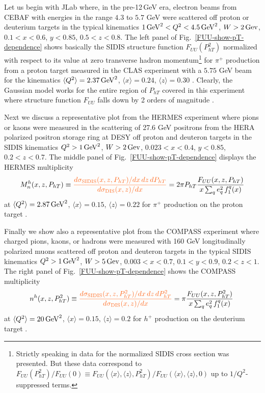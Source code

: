 \documentclass[a4paper,11pt]{article}
\newcommand{\blue}[1]{{\color{blue} #1}}
\newcommand{\be}{\begin{equation}}
\newcommand{\ee}{\end{equation}}
\newcommand{\la}{\langle}
\newcommand{\ra}{\rangle}
\newcommand{\orange}[1]{{\color{orange} #1}}
\newcommand{\ps}[1]{\blue{ #1}}
\newcommand{\ak}[1]{\orange{ #1}}
\def\Phperp{P_{hT}}
\begin{document}
\ps{Let us begin with JLab where, in the pre-12$\,$GeV era, electron beams 
from CEBAF with energies in the range $4.3$ to $5.7$ GeV were scattered 
off proton or deuterium targets in the typical kinematics 
$1 \,{\rm GeV}^2 < Q^2 < 4.5 \,{\rm GeV}^2$, $W > 2\,{\rm Gev}$, 
$0.1 < x < 0.6$, $y < 0.85$, $0.5<z<0.8$.
The left panel of Fig.~\ref{FUU-show-pT-dependence} shows basically
the SIDIS structure function $F_{UU}(P_{hT}^2)$ normalized with respect
to its value at zero transverse hadron momentum\footnote{Strictly 
	speaking in \cite{Osipenko:2008aa} data for the normalized 
	SIDIS cross section was presented. But these data correspond 
	to $F_{UU}(P_{hT}^2)/F_{UU}(0) \equiv
	F_{UU}(\la x\ra,\la z\ra,P_{hT}^2)/F_{UU}(\la x\ra,\la z\ra,0)$
	up to $1/Q^2$-suppressed terms.}
for $\pi^+$ production from a proton target measured in the CLAS experiment 
with a $5.75$ GeV beam for the kinematics $\la Q^2\ra=2.37\,{\rm GeV}^2$, 
$\la x\ra=0.24$, $\la z\ra=0.30$ \cite{Osipenko:2008aa}. Clearly, the 
Gaussian model works for the entire region of $P_{hT}$ covered in this 
experiment where structure function $F_{UU}$ falls down by 2 orders of 
magnitude \cite{Schweitzer:2010tt}.

Next we discuss a representative plot from the HERMES experiment 
where pions or kaons were measured in the scattering of 27.6 GeV 
positrons from the HERA polarized positron storage ring at DESY 
off proton and deuteron targets in the SIDIS kinematics 
$Q^2 > 1 \,{\rm GeV}^2$, $W > 2\,{\rm Gev}$, 
$0.023 < x < 0.4$, $y < 0.85$, $0.2<z<0.7$. 
The middle panel of Fig.~\ref{FUU-show-pT-dependence} displays the 
HERMES multiplicity~\cite{Airapetian:2012ki}
\be\label{Eq:multiplicity-HERMES}
	M_n^h(x,z,\Phperp) \equiv 
	\ak{\frac{d\sigma_{\rm SIDIS}(x,z,\Phperp)/dx\,dz\,d\Phperp}
	{d\sigma_{\rm DIS}(x,z)/dx}} =
	2 \pi \Phperp \frac{F_{UU}(x,z,\Phperp) }{ x \sum_q e_q^2\,f^q_1(x)}
\ee
at $\la Q^2\ra=2.87\,{\rm GeV}^2$, $\la x\ra=0.15$, $\la z\ra=0.22$ 
for $\pi^+$ production on the proton target \cite{Airapetian:2012ki}. 

Finally we show also a representative plot from the COMPASS experiment 
where charged pions, kaons, or hadrons were measured with 160 GeV 
longitudinally polarized muons scattered off proton and deuteron 
targets in the typical SIDIS kinematics 
$Q^2 > 1 \,{\rm GeV}^2$, $W > 5\,{\rm Gev}$, 
$0.003 < x < 0.7$, $0.1<y < 0.9$, $0.2<z<1$. 
The right panel of
Fig.~\ref{FUU-show-pT-dependence} shows the COMPASS multiplicity 
\cite{Aghasyan:2017ctw}
\be\label{Eq:multiplicity-COMPASS}
	n^h(x,z,\Phperp^2)  \equiv 
	\ak{\frac{d\sigma_{\rm SIDIS}(x,z,\Phperp^2)/dx\,dz\,d\Phperp^2}
	{d\sigma_{\rm DIS}(x,z)/dx}} =
	\pi \frac{F_{UU}(x,z,\Phperp^2) }{ x \sum_q e_q^2\,f^q_1(x)}\;
\ee
at $\la Q^2\ra=20\,{\rm GeV}^2$, $\la x\ra  =0.15$, $\la z\ra  =0.2$ 
for $h^+$ production on the deuterium target \cite{Aghasyan:2017ctw}.}
\end{document}
